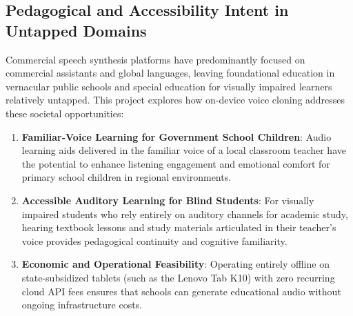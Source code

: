 \subsection{Pedagogical and Accessibility Intent in Untapped Domains}
Commercial speech synthesis platforms have predominantly focused on commercial assistants and global languages, leaving foundational education in vernacular public schools and special education for visually impaired learners relatively untapped. This project explores how on-device voice cloning addresses these societal opportunities:
\begin{enumerate}
    \item \textbf{Familiar-Voice Learning for Government School Children}: Audio learning aids delivered in the familiar voice of a local classroom teacher have the potential to enhance listening engagement and emotional comfort for primary school children in regional environments.
    \item \textbf{Accessible Auditory Learning for Blind Students}: For visually impaired students who rely entirely on auditory channels for academic study, hearing textbook lessons and study materials articulated in their teacher's voice provides pedagogical continuity and cognitive familiarity.
    \item \textbf{Economic and Operational Feasibility}: Operating entirely offline on state-subsidized tablets (such as the Lenovo Tab K10) with zero recurring cloud API fees ensures that schools can generate educational audio without ongoing infrastructure costs.
\end{enumerate}

